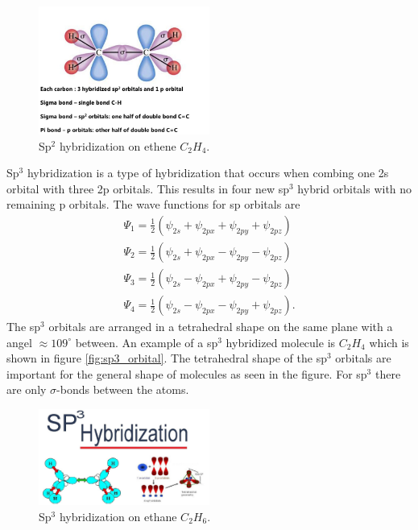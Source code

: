 \documentclass[jmp, amsmath, amssymb, reprint]{article}
\numberwithin{equation}{section}
\newcommand{\lp}{\left(}
\newcommand{\rp}{\right)}
\begin{document}
\begin{multicols}{2}
\begin{figure}[H]
	\centering
  	\includegraphics[width=0.50\textwidth]{sp2_orbital.png}%
	\caption{Sp\(^2\) hybridization on ethene \(C_2H_4\).}
	\label{fig:sp2_orbital}
\end{figure}

Sp\(^3\) hybridization is a type of hybridization that occurs when combing one 2s orbital with three 2p orbitals. This results in four new sp\(^3\) hybrid orbitals with no remaining p orbitals. The wave functions for sp orbitals are
\begin{align}
\Psi_1 = \frac{1}{2}\lp \psi_{2s} + \psi_{2px} + \psi_{2py} + \psi_{2pz}\rp\\
\Psi_2 = \frac{1}{2}\lp \psi_{2s} + \psi_{2px} - \psi_{2py} - \psi_{2pz}\rp\\
\Psi_3 = \frac{1}{2}\lp \psi_{2s} - \psi_{2px} + \psi_{2py} - \psi_{2pz}\rp\\
\Psi_4 = \frac{1}{2}\lp \psi_{2s} - \psi_{2px} - \psi_{2py} + \psi_{2pz}\rp.
\end{align}
The sp\(^3\) orbitals are arranged in a tetrahedral shape on the same plane with a angel \(\approx 109^\circ\) between. An example of a sp\(^3\) hybridized molecule is \(C_2H_4\) which is shown in figure \ref{fig:sp3_orbital}. The tetrahedral shape of the sp\(^3\) orbitals are important for the general shape of molecules as seen in the figure. For sp\(^3\) there are only \(\sigma\)-bonds between the atoms.

\begin{figure}[H]
	\centering
  	\includegraphics[width=0.50\textwidth]{sp3_orbital.png}%
	\caption{Sp\(^3\) hybridization on ethane \(C_2H_6\).}
	\label{fig:sp2_orbital}
\end{figure}


\end{multicols}
\end{document}
